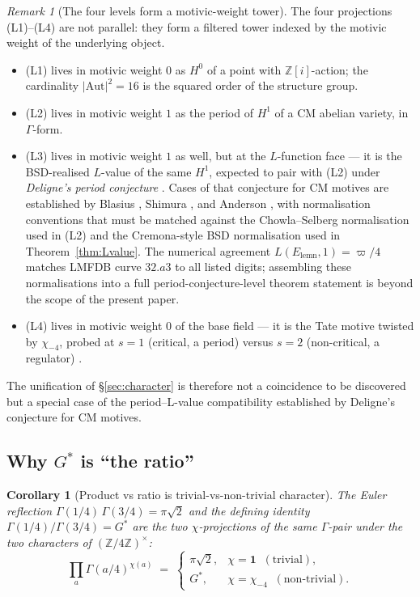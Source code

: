 \documentclass[11pt]{article}
\newtheorem{corollary}[theorem]{Corollary}
\theoremstyle{definition}
\theoremstyle{remark}
\newtheorem*{remark}{Remark}
\newcommand{\Gs}{G^{*}}
\newcommand{\Z}{\mathbb{Z}}
\newcommand{\Aut}{\mathrm{Aut}}
\begin{document}
\begin{remark}[The four levels form a motivic-weight tower]\label{rem:motivic-tower}
The four projections (L1)--(L4) are not parallel: they form a filtered
tower indexed by the motivic weight of the underlying object.
\begin{itemize}[leftmargin=*, itemsep=2pt]
\item (L1) lives in motivic weight $0$ as $H^{0}$ of a point with
$\Z[i]$-action; the cardinality $|\Aut|^{2} = 16$ is the squared order of
the structure group.
\item (L2) lives in motivic weight $1$ as the period of $H^{1}$ of a CM
abelian variety, in $\Gamma$-form.
\item (L3) lives in motivic weight $1$ as well, but at the $L$-function
face --- it is the BSD-realised $L$-value of the same $H^{1}$,
expected to pair with (L2) under \emph{Deligne's period conjecture}
\cite{deligne-periods}. Cases of that conjecture for CM motives are
established by Blasius \cite{blasius1986}, Shimura \cite{shimura1979},
and Anderson \cite{anderson1986}, with normalisation conventions that
must be matched against the Chowla--Selberg normalisation used in (L2)
and the Cremona-style BSD normalisation used in
Theorem~\ref{thm:Lvalue}. The numerical agreement
$L(E_{\mathrm{lemn}}, 1) = \varpi/4$ matches LMFDB curve $32.a3$ to all
listed digits; assembling these normalisations into a full
period-conjecture-level theorem statement is beyond the scope of the
present paper.
\item (L4) lives in motivic weight $0$ of the base field --- it is the
Tate motive twisted by $\chi_{-4}$, probed at $s = 1$ (critical, a
period) versus $s = 2$ (non-critical, a regulator)
\cite{beilinson-deligne}.
\end{itemize}
The unification of \S\ref{sec:character} is therefore not a coincidence
to be discovered but a special case of the period--L-value compatibility
established by Deligne's conjecture for CM motives.
\end{remark}

\subsection{Why $\Gs$ is ``the ratio''}

\begin{corollary}[Product vs ratio is trivial-vs-non-trivial character]\label{cor:product-vs-ratio}
The Euler reflection $\Gamma(1/4)\,\Gamma(3/4) = \pi\sqrt 2$ and the
defining identity $\Gamma(1/4)/\Gamma(3/4) = \Gs$ are the two
$\chi$-projections of the same $\Gamma$-pair under the two characters of
$(\Z/4\Z)^\times$:
\[
\prod_a \Gamma(a/4)^{\chi(a)} \;=\;
\begin{cases}
\pi\sqrt 2, & \chi = \mathbf{1}\;\;(\text{trivial}), \\
\Gs,        & \chi = \chi_{-4}\;\;(\text{non-trivial}).
\end{cases}
\]
\end{corollary}
\end{document}
